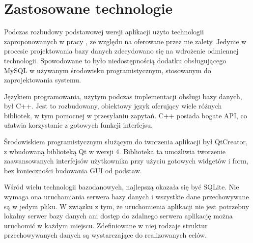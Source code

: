\section{Zastosowane technologie}
\label{sec:implementacja}

Podczas rozbudowy podstawowej wersji aplikacji użyto technologii zaproponowanych w pracy \cite{Gl11}, ze względu na oferowane przez nie zalety. Jedynie w procesie projektowania bazy danych zdecydowano się na wdrożenie odmiennej technologii. Spowodowane to było niedostępnością dodatku obsługującego MySQL w używanym środowisku programistycznym, stosowanym do zaprojektowania systemu.

Językiem programowania, użytym podczas implementacji obsługi bazy danych, był C++. Jest to rozbudowany, obiektowy język oferujący wiele różnych bibliotek, w tym pomocnej w przesyłaniu zapytań. C++ posiada bogate API, co ułatwia korzystanie z gotowych funkcji interfejsu.

Środowiskiem programistycznym służącym do tworzenia aplikacji był QtCreator, z wbudowaną biblioteką Qt w wersji 4. Biblioteka ta umożliwia tworzenie zaawansowanych interfejsów użytkownika przy użyciu gotowych widgetów i form, bez konieczności budowania GUI od podstaw.

Wśród wielu technologii bazodanowych, najlepszą okazała się być SQLite. Nie wymaga ona uruchamiania serwera bazy danych i wszystkie dane przechowywane są w jedym pliku. W związku z tym, że uruchomienia aplikacji nie jest potrzebny lokalny serwer bazy danych ani dostęp do zdalnego serwera aplikację można uruchomić w każdym miejscu. Zdefiniowane w niej rodzaje struktur przechowywanych danych są wystarczające do realizowanych celów.
